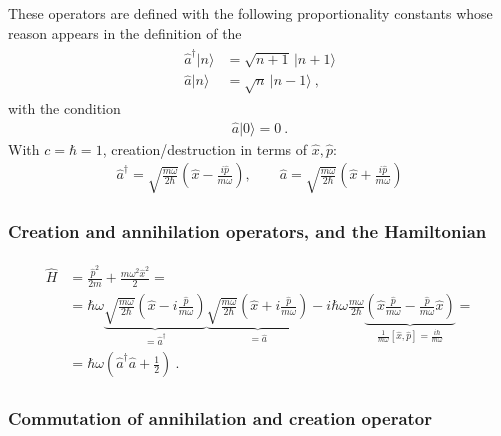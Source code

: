 \documentclass[letterpaper,10pt,english]{jupyterBook}
\begin{document}
\sphinxAtStartPar
These operators are defined with the following proportionality constants \sphinxhyphen{} whose reason appears in the definition of the {\hyperref[\detokenize{ch/quantum-mechanics/qft/harmonic-oscillator:quantum-mechanics-qft-harmonic-oscillator-quantization-number-operator}]{}} \sphinxhyphen{}
\begin{equation*}
\begin{split}\begin{aligned}
\hat a^\dagger|n\rangle & =\sqrt{n+1}\,|n+1\rangle \\
\hat a|n\rangle & =\sqrt{n}\,|n-1\rangle \ ,
\end{aligned}\end{split}
\end{equation*}
\sphinxAtStartPar
with the condition
\begin{equation*}
\begin{split}
\hat a|0\rangle=0 \ .
\end{split}
\end{equation*}
\sphinxAtStartPar
With \(c=\hbar=1\), creation/destruction in terms of \(\hat x,\hat p\):
\begin{equation*}
\begin{split}
\hat a^\dagger=\sqrt{\tfrac{m\omega}{2\hbar}}\left(\hat x-\tfrac{i\hat p}{m\omega}\right),\qquad
\hat a=\sqrt{\tfrac{m\omega}{2\hbar}}\left(\hat x+\tfrac{i\hat p}{m\omega}\right)
\end{split}
\end{equation*}\subsubsection*{Creation and annihilation operators, and the Hamiltonian}
\begin{equation*}
\begin{split}\begin{aligned}
  \hat{H}
  & = \frac{\hat{p}^2}{2 m} + \frac{m \omega^2 \hat{x}^2}{2} = \\
  & = \hbar \omega \underbrace{ \sqrt{\frac{m \omega}{2 \hbar}} \left( \hat{x} - i \frac{\hat{p}}{m \omega} \right)}_{= \hat{a}^\dagger} \underbrace{\sqrt{\frac{m\omega}{2 \hbar}} \left( \hat{x} + i \frac{\hat{p}}{m \omega} \right)}_{=\hat{a}} - i \hbar \omega \frac{m \omega}{2 \hbar} \underbrace{\left( \hat{x} \frac{\hat{p}}{m \omega} - \frac{\hat{p}}{m \omega} \hat{x} \right)}_{\frac{1}{m \omega}[\hat{x}, \hat{p}] = \frac{i \hbar}{m \omega}} = \\
  & = \hbar\omega \left( \hat{a}^\dagger \hat{a} + \frac{1}{2} \right) \ . 
\end{aligned}\end{split}
\end{equation*}\subsubsection*{Commutation of annihilation and creation operator}
\end{document}

